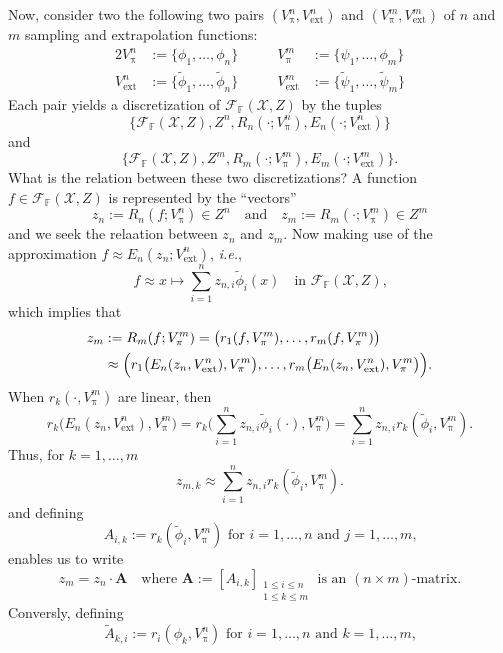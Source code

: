 \documentclass[a4paper]{paper}
\newcommand{\VecSpace}[1]{\mathscr{#1}}
\newcommand{\Field}{\mathbb{F}}
\DeclareMathOperator{\rest}{\pi}
\newcommand{\ie}{\textsl{i.e.}\xspace}
\newcommand{\vA}{\boldsymbol{A}}
\newcommand{\cF}{\mathcal{F}}
\newcommand{\ext}{\text{ext}}
\newcommand{\wt}[1]{\widetilde{#1}}
\begin{document}
Now, consider two the following two pairs $(V^n_{\rest},V^n_{\ext})$ and 
$(V^m_{\rest},V^m_{\ext})$ of $n$ and $m$ sampling and extrapolation 
functions:
\begin{alignat*}{2}
  V^n_{\rest} &:=\{ \phi_{1},\ldots,\phi_{n} \} &\qquad
  V^m_{\rest} &:=\{ \psi_{1},\ldots,\phi_{m} \}  \\
  V^n_{\ext} &:=\{ \wt{\phi}_{1},\ldots,\wt{\phi}_{n} \} &\qquad
  V^m_{\ext} &:=\{ \wt{\psi}_{1},\ldots,\wt{\psi}_{m} \}    
\end{alignat*}
Each pair yields a discretization of $\cF_{\Field}(\VecSpace{X},Z)$ by the tuples
\[ 
   \bigl\{
     \cF_{\Field}(\VecSpace{X},Z),Z^n,R_{n}(\cdot;V^n_{\rest}),E_{n}(\cdot;V^n_{\ext})
   \bigr\} \]
and
\[ \bigl\{
     \cF_{\Field}(\VecSpace{X},Z),Z^m,R_{m}(\cdot;V^m_{\rest}),E_{m}(\cdot;V^m_{\ext})
   \bigr\}. \] 
What is the relation between these two discretizations? A function 
$f\in \cF_{\Field}(\VecSpace{X},Z)$ is represented by the ``vectors'' 
\[ z_{n}:= R_{n}(f;V^n_{\rest})\in Z^n \quad\text{and}\quad
   z_{m}:= R_{m}(\cdot;V^m_{\rest})\in Z^m \]
and we seek the relaation between $z_{n}$ and $z_{m}$. 
Now making use of the approximation $f\approx 
E_{n}(z_{n};V^n_{\ext})$, \ie,
\[ f \approx x \mapsto 
       \sum_{i=1}^n z_{n,i} \wt{\phi}_{i}(x)
   \quad\text{in $\cF_{\Field}(\VecSpace{X},Z)$,} 
\]
which implies that
\begin{align*}
  z_{m} &:=R_{m}(f;V^m_{\rest}) =
    \bigl( r_{1}(f,V^m_{\rest}),\ldots,r_{m}(f,V^m_{\rest}) \bigr) \\
    &\approx 
      \Bigl( r_{1}\bigl(E_{n}(z_{n},V^n_{\ext}),V^m_{\rest}\bigr),
             \ldots,
	     r_{m}\bigl(E_{n}(z_{n},V^n_{\ext}),V^m_{\rest}\bigr)
      \Bigr).
\end{align*}
When $r_{k}(\cdot,V^m_{\rest})$ are linear, then 
\[ r_{k}\bigl(E_{n}(z_{n},V^n_{\ext}),V^m_{\rest}\bigr)=
     r_{k}\biggl(\sum_{i=1}^n 
       z_{n,i}\wt{\phi}_{i}(\cdot),V^m_{\rest}\biggr)=
     \sum_{i=1}^n z_{n,i} r_{k}(\wt{\phi}_{i},V^m_{\rest}).
\]   
Thus, for $k=1,\ldots,m$
\[
  z_{m,k}\approx 
    \sum_{i=1}^n z_{n,i} r_{k}(\wt{\phi}_{i},V^m_{\rest}).
\]    
and defining 
\[ A_{i,k}:= r_{k}(\wt{\phi}_{i},V^m_{\rest})
   \text{ for $i=1,\ldots,n$ and $j=1,\ldots,m$,} \]
enables us to write
\[ z_{m}=z_{n}\cdot\vA
   \quad\text{where } 
   \vA:=[ A_{i,k} ]_{\substack{1\leq i \leq n \\ 1\leq k \leq m}}
   \text{ is an $(n\times m)$-matrix.} \]
Conversly, defining 
\[ \wt{A}_{k,i}:=r_{i}(\phi_{k},V^n_{\rest})
   \text{ for $i=1,\ldots,n$ and $k=1,\ldots,m$,} \]
\end{document}
